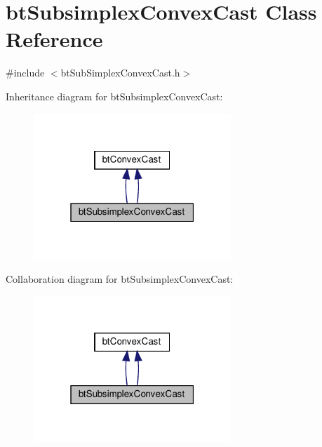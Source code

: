 \hypertarget{classbtSubsimplexConvexCast}{}\section{bt\+Subsimplex\+Convex\+Cast Class Reference}
\label{classbtSubsimplexConvexCast}


{\ttfamily \#include $<$bt\+Sub\+Simplex\+Convex\+Cast.\+h$>$}



Inheritance diagram for bt\+Subsimplex\+Convex\+Cast\+:
\nopagebreak
\begin{figure}[H]
\begin{center}
\leavevmode
\includegraphics[width=211pt]{classbtSubsimplexConvexCast__inherit__graph}
\end{center}
\end{figure}


Collaboration diagram for bt\+Subsimplex\+Convex\+Cast\+:
\nopagebreak
\begin{figure}[H]
\begin{center}
\leavevmode
\includegraphics[width=211pt]{classbtSubsimplexConvexCast__coll__graph}
\end{center}
\end{figure}
